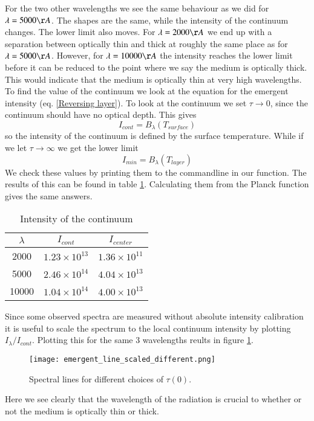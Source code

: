 \documentclass{aa}   %
\begin{document}
For the two other wavelengths we see the same behaviour as we did for $\lambda = 5000 \AA$. The shapes are the same, while the intensity of the continuum changes. The lower limit also moves. For $\lambda = 2000 \AA$ we end up with a separation between optically thin and thick at roughly the same place as for $\lambda = 5000 \AA$. However, for $\lambda = 10000 \AA$ the intensity reaches the lower limit before it can be reduced to the point where we say the medium is optically thick. This would indicate that the medium is optically thin at very high wavelengths. To find the value of the continuum we look at the equation for the emergent intensity (eq. \ref{Reversing layer}). To look at the continuum we set $\tau \rightarrow 0$, since the continuum should have no optical depth. This gives 
\begin{equation}
I_{cont}  = B_\lambda(T_{surface})
\end{equation}
so the intensity of the continuum is defined by the surface temperature.
While if we let $\tau \rightarrow \infty$ we get the lower limit
\begin{equation}
I_{min}  = B_\lambda(T_{layer})
\end{equation}
We check these values by printing them to the commandline in our function. The results of this can be found in table \ref{I_Cont}. Calculating them from the Planck function gives the same answers.
\begin{table}
\begin{center}
\begin{tabular}{| c | c | c |}
\hline
$\lambda$ & $I_{cont}$ & $I_{center}$\\
\hline
2000 & $1.23\times 10^{13}$ & $1.36\times 10^{11}$\\
\hline
5000 & $2.46\times 10^{14}$ & $4.04\times 10^{13}$\\
\hline
10000 & $1.04\times 10^{14}$ & $4.00\times 10^{13}$\\
\hline
\end{tabular}\label{I_Cont}
\caption{Intensity of the continuum}
\end{center}
\end{table}
Since some observed spectra are measured without absolute intensity calibration it is useful to scale the spectrum to the local continuum intensity by plotting $I_\lambda/I_{cont}$. Plotting this for the same 3 wavelengths reults in figure \ref{emergent_line_scaled_different}.
\begin{figure}[hbtp]
 \texttt{[image: emergent\_line\_scaled\_different.png]}
 \caption{Spectral lines for different choices of $\tau(0)$.}
 \label{emergent_line_scaled_different} 
\end{figure}
Here we see clearly that the wavelength of the radiation is crucial to whether or not the medium is optically thin or thick.
\end{document}
